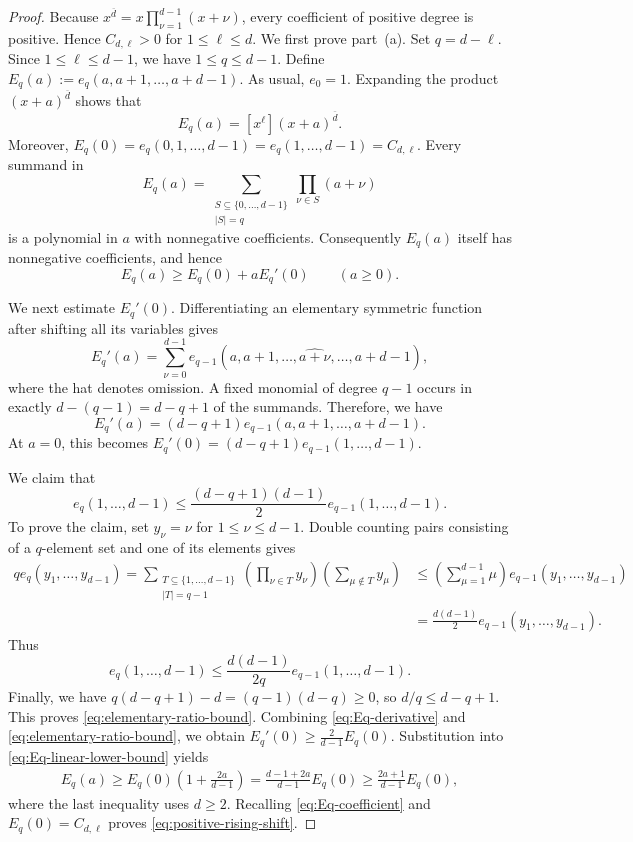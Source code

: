 \documentclass[10pt,a4paper]{amsart}
\begin{document}
\begin{proof}
Because $x^{\overline d}=x\prod_{\nu=1}^{d-1}(x+\nu)$, every coefficient of positive degree is positive.  Hence
$C_{d,\ell}>0$ for $1\leq\ell\leq d$.
We first prove part~(a).  Set $q=d-\ell$.  Since $1\leq\ell\leq d-1$, we have $1\leq q\leq d-1$.  Define
$E_q(a):=e_q(a,a+1,\ldots,a+d-1)$.
As usual, $e_0=1$. Expanding the product $(x+a)^{\overline d}$ shows that
\begin{equation}\label{eq:Eq-coefficient}
 E_q(a)=[x^\ell](x+a)^{\overline d}.
\end{equation}
Moreover, $E_q(0)=e_q(0,1,\ldots,d-1)=e_q(1,\ldots,d-1)=C_{d,\ell}$.
Every summand in
\[E_q(a)=\sum_{\substack{S\subseteq\{0,\ldots,d-1\}\\|S|=q}}\prod_{\nu\in S}(a+\nu)\]
is a polynomial in $a$ with nonnegative coefficients.  Consequently $E_q(a)$ itself has nonnegative coefficients, and hence
\begin{equation}\label{eq:Eq-linear-lower-bound}
 E_q(a)\geq E_q(0)+aE_q'(0)\qquad(a\geq0).
\end{equation}

We next estimate $E_q'(0)$.  Differentiating an elementary symmetric
function after shifting all its variables gives
\[E_q'(a)=\sum_{\nu=0}^{d-1}e_{q-1}(a,a+1,\ldots,\widehat{a+\nu},\ldots,a+d-1),
\]
where the hat denotes omission.  A fixed monomial of degree $q-1$
occurs in exactly $d-(q-1)=d-q+1$ of the summands.  Therefore, we have 
\begin{equation}\label{eq:Eq-derivative}
 E_q'(a)=(d-q+1)e_{q-1}(a,a+1,\ldots,a+d-1).
\end{equation}
At $a=0$, this becomes $E_q'(0)=(d-q+1)e_{q-1}(1,\ldots,d-1)$.

We claim that
\begin{equation}\label{eq:elementary-ratio-bound}
 e_q(1,\ldots,d-1)
 \leq\frac{(d-q+1)(d-1)}2e_{q-1}(1,\ldots,d-1).
\end{equation}
To prove the claim, set $y_\nu=\nu$ for $1\leq\nu\leq d-1$.
Double counting pairs consisting of a $q$-element set and one of its
elements gives
\begin{align*}
 q e_q(y_1,\ldots,y_{d-1})
=\sum_{\substack{T\subseteq\{1,\ldots,d-1\}\\|T|=q-1}}\left(\prod_{\nu\in T}y_\nu\right)\left(\sum_{\mu\notin T}y_\mu\right)
&\leq\left(\sum_{\mu=1}^{d-1}\mu\right)e_{q-1}(y_1,\ldots,y_{d-1})
\\& =\frac{d(d-1)}2e_{q-1}(y_1,\ldots,y_{d-1}).
\end{align*}
Thus
\[e_q(1,\ldots,d-1)\leq\frac{d(d-1)}{2q}e_{q-1}(1,\ldots,d-1).
\]
Finally, we have $q(d-q+1)-d=(q-1)(d-q)\geq0$, so $d/q\leq d-q+1$.  This proves \eqref{eq:elementary-ratio-bound}.
Combining \eqref{eq:Eq-derivative} and \eqref{eq:elementary-ratio-bound}, we obtain
$E_q'(0)\geq\frac2{d-1}E_q(0)$.
Substitution into \eqref{eq:Eq-linear-lower-bound} yields
\begin{align*}
E_q(a)\geq E_q(0)\left(1+\frac{2a}{d-1}\right)=\frac{d-1+2a}{d-1}E_q(0)\geq\frac{2a+1}{d-1}E_q(0),
\end{align*}
where the last inequality uses $d\geq2$.  Recalling \eqref{eq:Eq-coefficient} and $E_q(0)=C_{d,\ell}$ proves \eqref{eq:positive-rising-shift}.


\end{proof}
\end{document}
